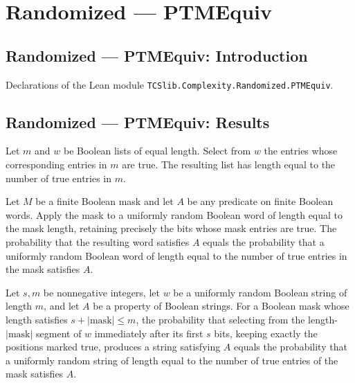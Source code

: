 \section{Randomized --- PTMEquiv}
\subsection*{Randomized --- PTMEquiv: Introduction}

Declarations of the Lean module \texttt{TCSlib.Complexity.Randomized.PTMEquiv}.

\subsection*{Randomized --- PTMEquiv: Results}

\begin{theorem}
\label{Randomized.length_maskSelect}
\leanok
{}
Let $m$ and $w$ be Boolean lists of equal length. Select from $w$ the entries whose
corresponding entries in $m$ are true. The resulting list has length equal to the number
of true entries in $m$.
\end{theorem}

\begin{theorem}
\label{Randomized.randProb_maskSelect}
\leanok
{}
Let $M$ be a finite Boolean mask and let $A$ be any predicate on finite Boolean words.
Apply the mask to a uniformly random Boolean word of length equal to the mask length,
retaining precisely the bits whose mask entries are true. The probability that the
resulting word satisfies $A$ equals the probability that a uniformly random Boolean word
of length equal to the number of true entries in the mask satisfies $A$.
\end{theorem}

\begin{theorem}
\label{Randomized.randProb_maskSelect_drop_take}
\leanok
{}
Let $s,m$ be nonnegative integers, let $w$ be a uniformly random Boolean string of
length $m$, and let $A$ be a property of Boolean strings. For a Boolean mask whose
length satisfies $s+|\mathrm{mask}|\le m$, the probability that selecting from the
length-$|\mathrm{mask}|$ segment of $w$ immediately after its first $s$ bits, keeping
exactly the positions marked true, produces a string satisfying $A$ equals the
probability that a uniformly random string of length equal to the number of true entries
of the mask satisfies $A$.
\end{theorem}

